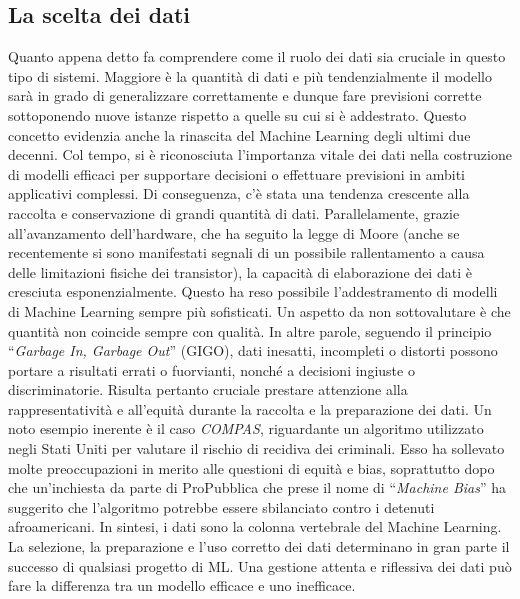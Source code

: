 \documentclass[12pt,a4paper,twoside,openright]{book}
\begin{document}
\subsection{La scelta dei dati}
Quanto appena detto fa comprendere come il ruolo dei dati sia cruciale in questo tipo di sistemi. Maggiore è la quantità di dati e più tendenzialmente il modello sarà in grado di generalizzare correttamente e dunque fare previsioni corrette sottoponendo nuove istanze rispetto a quelle su cui si è addestrato. 
Questo concetto evidenzia anche la rinascita del Machine Learning degli ultimi due decenni. Col tempo, si è riconosciuta l'importanza vitale dei dati nella costruzione di modelli efficaci per supportare decisioni o effettuare previsioni in ambiti applicativi complessi. Di conseguenza, c'è stata una tendenza crescente alla raccolta e conservazione di grandi quantità di dati. Parallelamente, grazie all'avanzamento dell'hardware, che ha seguito la legge di Moore (anche se recentemente si sono manifestati segnali di un possibile rallentamento a causa delle limitazioni fisiche dei transistor), la capacità di elaborazione dei dati è cresciuta esponenzialmente. Questo ha reso possibile l'addestramento di modelli di Machine Learning sempre più sofisticati.
Un aspetto da non sottovalutare è che quantità non coincide sempre con qualità. In altre parole, seguendo il principio ``\emph{Garbage In, Garbage Out}'' (GIGO), dati inesatti, incompleti o distorti possono portare a risultati errati o fuorvianti, nonché a decisioni ingiuste o discriminatorie.
Risulta pertanto cruciale prestare attenzione alla rappresentatività e all'equità durante la raccolta e la preparazione dei dati.
Un noto esempio inerente è il caso \emph{COMPAS}, riguardante un algoritmo utilizzato negli Stati Uniti per valutare il rischio di recidiva dei criminali. Esso ha sollevato molte preoccupazioni in merito alle questioni di equità e bias, soprattutto dopo che un'inchiesta da parte di ProPubblica che prese il nome di ``\emph{Machine Bias}''\cite{compas} ha suggerito che l'algoritmo potrebbe essere sbilanciato contro i detenuti afroamericani.
In sintesi, i dati sono la colonna vertebrale del Machine Learning. La selezione, la preparazione e l'uso corretto dei dati determinano in gran parte il successo di qualsiasi progetto di ML. Una gestione attenta e riflessiva dei dati può fare la differenza tra un modello efficace e uno inefficace.
\end{document}
